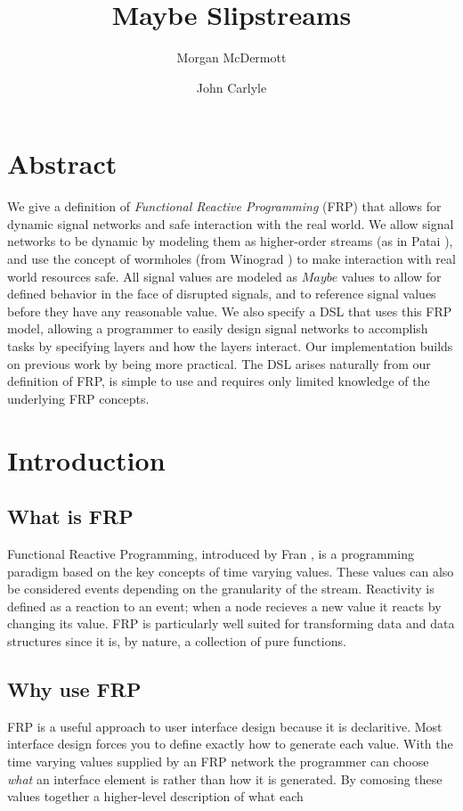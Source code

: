 \documentclass[twocolumn]{paper}
\title{Maybe Slipstreams}
\author[*]{Morgan McDermott}
\author[*]{John Carlyle}
\affil[*]{University of flightless dragons}
\begin{document}
\maketitle

\section*{Abstract}
We give a definition of \textit{Functional Reactive Programming} (FRP) that allows for dynamic signal networks and safe interaction with the real world. We allow signal networks to be dynamic by modeling them as higher-order streams (as in Patai \cite{HighOrderStreams}), and use the concept of wormholes (from Winograd \cite{WinogradCort2012HS}) to make interaction with real world resources safe. All signal values are modeled as $Maybe$ values to allow for defined behavior in the face of disrupted signals, and to reference signal values before they have any reasonable value. We also specify a DSL that uses this FRP model, allowing a programmer to easily design signal networks to accomplish tasks by specifying layers and how the layers interact. Our implementation builds on previous work by being more practical. The DSL arises naturally from our definition of FRP, is simple to use and requires only limited knowledge of the underlying FRP concepts.

\section{Introduction}
\subsection{What is FRP}
Functional Reactive Programming, introduced by Fran \cite{ElliottHudak97:Fran}, is a programming paradigm based on the key concepts of time varying values.   These values can also be considered events depending on the granularity of the stream. Reactivity is defined as a reaction to an event; when a node recieves a new value it reacts by changing its value. FRP is particularly well suited for transforming data and data structures since it is, by nature, a collection of pure functions. 

\subsection{Why use FRP}
FRP is a useful approach to user interface design because it is declaritive. Most interface design forces you to define exactly how to generate each value. With the time varying values supplied by an FRP network the programmer can choose \textit{what} an interface element is rather than how it is generated. By comosing these values together a higher-level description of what each 
\end{document}
